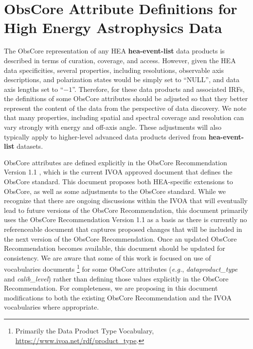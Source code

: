 \documentclass[11pt,a4paper]{ivoa}
\begin{document}
\pagebreak
\section{ObsCore Attribute Definitions for High Energy Astrophysics Data}
\label{sec:obscore}

The ObsCore representation of any \gls{HEA} \textbf{hea-event-list} data products is described in terms of curation, coverage, and access. However, given the \gls{HEA} data specificities, several properties, including resolutions, observable axis descriptions, and polarization states would be simply set to ``NULL'', and data axis lengths set to ``$-1$''. Therefore, for these data products and associated \glspl{IRF}, the definitions of some ObsCore attributes should be adjusted so that they better represent the content of the data from the perspective of data discovery. We note that many properties, including spatial and spectral coverage and resolution can vary strongly with energy and off-axis angle. These adjustments will also typically apply to higher-level advanced data products derived from \textbf{hea-event-list} datasets.


ObsCore attributes are defined explicitly in the ObsCore Recommendation Version 1.1 \citep{2017ivoa.spec.0509L}, which is the current \gls{IVOA} approved document that defines the ObsCore standard.  This document proposes both \gls{HEA}-specific extensions to ObsCore, as well as some adjustments to the ObsCore standard. While we recognize that there are ongoing discussions within the \gls{IVOA} that will eventually lead to future versions of the ObsCore Recommendation, this document primarily uses the ObsCore Recommendation Version 1.1 as a basis as there is currently no referenceable document that captures proposed changes that will be included in the next version of the ObsCore Recommendation. Once an updated ObsCore Recommendation becomes available, this document should be updated for consistency. We are aware that some of this work is focused on use of vocabularies documents \citep{2023ivoa.spec.0206D, 2021ivoa.spec.0525D}\footnote{Primarily the Data Product Type Vocabulary, \url{https://www.ivoa.net/rdf/product_type}.} for some ObsCore attributes ({\em e.g.\/}, {\em dataproduct\_type\/} and {\em calib\_level\/}) rather than defining those values explicitly in the ObsCore Recommendation. For completeness, we are proposing in this document modifications to both the existing ObsCore Recommendation and the IVOA vocabularies where appropriate.
\end{document}

